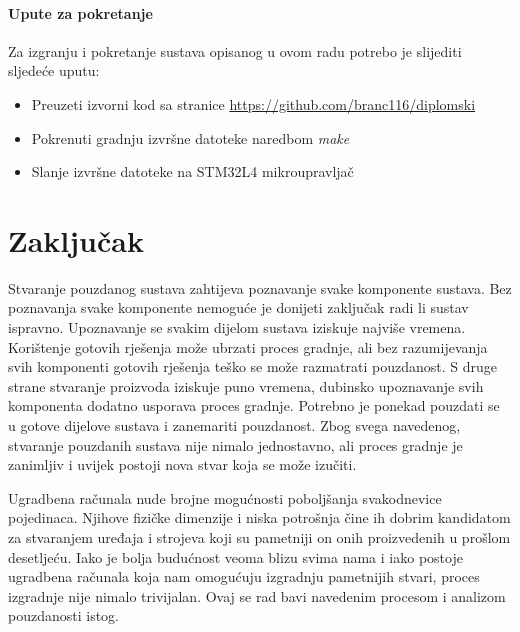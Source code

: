 \documentclass[times, utf8, diplomski]{diplomski}
\begin{document}
\subsubsection{Upute za pokretanje}
Za izgranju i pokretanje sustava opisanog u ovom radu potrebo je slijediti sljedeće uputu:

\begin{itemize}
  \item Preuzeti izvorni kod sa stranice \url{https://github.com/branc116/diplomski}
  \item Pokrenuti gradnju izvršne datoteke naredbom \textit{make}
  \item Slanje izvršne datoteke na STM32L4 mikroupravljač
\end{itemize}

\chapter{Zaključak}
Stvaranje pouzdanog sustava zahtijeva poznavanje svake komponente sustava.
Bez poznavanja svake komponente nemoguće je donijeti zaključak radi li sustav ispravno.
Upoznavanje se svakim dijelom sustava iziskuje najviše vremena.
Korištenje gotovih rješenja može ubrzati proces gradnje, ali bez razumijevanja svih komponenti gotovih rješenja teško se može razmatrati pouzdanost.
S druge strane stvaranje proizvoda iziskuje puno vremena, dubinsko upoznavanje svih komponenta dodatno usporava proces gradnje.
Potrebno je ponekad pouzdati se u gotove dijelove sustava i zanemariti pouzdanost.
Zbog svega navedenog, stvaranje pouzdanih sustava nije nimalo jednostavno, ali proces gradnje je zanimljiv i uvijek postoji nova stvar koja se može izučiti.

\nocite{*}



\listoffigures

\lstlistoflistings


\begin{sazetak}
Ugradbena računala nude brojne mogućnosti poboljšanja svakodnevice pojedinaca. Njihove fizičke dimenzije i niska potrošnja čine ih dobrim kandidatom za stvaranjem uređaja i strojeva koji su pametniji on onih proizvedenih u prošlom desetljeću. Iako je bolja budućnost veoma blizu svima nama i iako postoje ugradbena računala koja nam omogućuju izgradnju pametnijih stvari, proces izgradnje nije nimalo trivijalan. Ovaj se rad bavi navedenim procesom i analizom pouzdanosti istog.

\end{sazetak}
\end{document}
